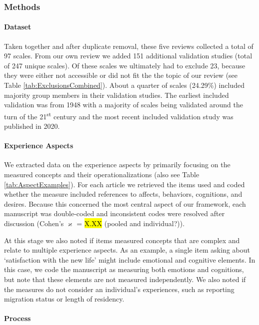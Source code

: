 \subsubsection{Methods}  
\paragraph{Dataset}

Taken together and after duplicate removal, these five reviews collected
a total of 97 scales. From our own review we added 151 additional
validation studies (total of 247 unique scales). Of these scales we
ultimately had to exclude 23, because they were either not accessible or
did not fit the the topic of our review (see Table
\ref{tab:ExclusionsCombined}). About a quarter of scales (24.29\%)
included majority group members in their validation studies. The
earliest included validation was from 1948 with a majority of scales
being validated around the turn of the 21\textsuperscript{st} century
and the most recent included validation study was published in 2020.

\paragraph{Experience Aspects}

We extracted data on the experience aspects by primarily focusing on the
measured concepts and their operationalizations (also see Table
\ref{tab:AspectExamples}). For each article we retrieved the items used
and coded whether the measure included references to affects, behaviors,
cognitions, and desires. Because this concerned the most central aspect
of our framework, each manuscript was double-coded and inconsistent
codes were resolved after discussion (Cohen's \(\varkappa\) = \hl{X.XX}
(pooled and individual?)).

At this stage we also noted if items measured concepts that are complex
and relate to multiple experience aspects. As an example, a single item
asking about `satisfaction with the new life' might include emotional
and cognitive elements. In this case, we code the manuscript as
measuring both emotions and cognitions, but note that these elements are
not measured independently. We also noted if the measures do not
consider an individual's experiences, such as reporting migration status
or length of residency.

\paragraph{Process}

